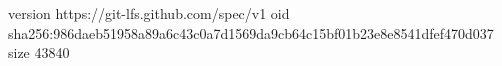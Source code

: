 version https://git-lfs.github.com/spec/v1
oid sha256:986daeb51958a89a6c43c0a7d1569da9cb64c15bf01b23e8e8541dfef470d037
size 43840
